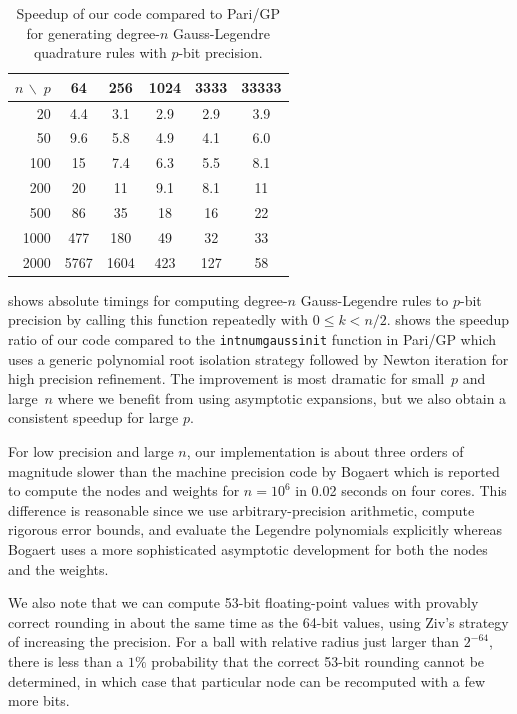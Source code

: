 \documentclass[nohypdvips,review]{siamart0216}
\begin{document}
\begin{table}[h!]
\caption{Speedup of our code compared to Pari/GP for generating degree-$n$ Gauss-Legendre quadrature rules with $p$-bit precision.}
\label{tab:parispeedup}
\begin{center}
\begin{tabular}{ r | c c c c c }
$n\, \backslash \; p$ & 64 & 256 & 1024 & 3333 & 33333 \\ \hline
20  & 4.4  &  3.1  &  2.9  &  2.9  &  3.9  \\ 
50  & 9.6  &  5.8 &  4.9  &  4.1 &  6.0  \\ 
100  &  15 &   7.4  &   6.3  &  5.5 &  8.1  \\ 
200  &  20  &  11  &  9.1  &  8.1  &  11  \\ 
500  &  86 & 35  &  18  &  16  &  22  \\ 
1000  & 477  &  180 &  49  &  32  &  33  \\ 
2000  &  5767 & 1604  &  423  &  127  &  58  \\ 
\end{tabular}
\end{center}
\end{table}

 shows absolute timings for computing
degree-$n$ Gauss-Legendre rules to $p$-bit precision
by calling this function repeatedly with $0 \le k < n / 2$.
 shows the speedup ratio of our code
compared to the \texttt{intnumgaussinit} function in Pari/GP
which uses a generic polynomial root isolation strategy
followed by Newton iteration for high precision refinement.
The improvement is most dramatic for small~$p$ and large~$n$ where
we benefit from using asymptotic expansions, but we also obtain a
consistent speedup for large $p$.

For low precision and large $n$, our implementation
is about three orders of magnitude slower than the machine precision
code by Bogaert \cite{bogaert2014iteration}
which is reported to compute the nodes and weights for $n = 10^6$
in 0.02 seconds on four cores.
This difference is reasonable since we use arbitrary-precision arithmetic,
compute rigorous error bounds, and evaluate the Legendre polynomials
explicitly whereas Bogaert uses a more sophisticated
asymptotic development for both the nodes and the weights.

We also note that we can compute 53-bit floating-point values
with provably correct rounding in about the same time as the 64-bit
values, using Ziv's strategy of increasing the precision.
For a ball with relative radius just larger than $2^{-64}$, there
is less than a $1\%$ probability that the correct 53-bit rounding
cannot be determined, in which case that particular node
can be recomputed with a few more bits.
\end{document}
